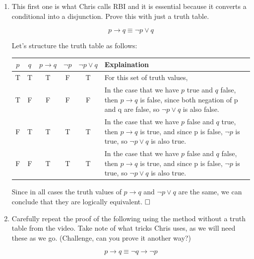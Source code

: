 \documentclass{article}
\newcommand{\sectionbreak}{\clearpage}
\begin{document}
\begin{enumerate}[label=(\alph*)]

    \item This first one is what Chris calls RBI and it is essential because it converts a conditional into a disjunction. Prove this with just a truth table.

    \[p \to q \equiv \neg p \lor q\]

    Let's structure the truth table as follows:
    \smallbreak
    \begin{tabular}{|c|c|c|c|c|p{11cm}|}
        \hline
        $p$ & $q$ & $p \to q$ & $\neg p$ & $\neg p \lor q$ & Explaination \\
        \hline
        T & T & T & F & T & For this set of truth values,  \\
        \hline
        T & F & F & F & F & In the case that we have $p$ true and $q$ false, then $p \to q$ is false, since both negation of p and q are false, so $\neg p \lor q$ is also false. \\
        \hline
        F & T & T & T & T & In the case that we have $p$ false and $q$ true, then $p \to q$ is true, and since p is false, $\neg p$ is true, so $\neg p \lor q$ is also true. \\
        \hline
        F & F & T & T & T & In the case that we have $p$ false and $q$ false, then $p \to q$ is true, and since p is false, $\neg p$ is true, so $\neg p \lor q$ is also true. \\
        \hline
    \end{tabular}
    \smallbreak
    Since in all cases the truth values of $p \to q$ and $\neg p \lor q$ are the same, we can conclude that they are logically equivalent.
    $\hfill \square$
    \sectionbreak
    \item Carefully repeat the proof of the following using the method without a truth table
    from the video. Take note of what tricks Chris uses, as we will need these as we
    go. (Challenge, can you prove it another way?)


    \[p \to q \equiv \neg q \to \neg p\]


\end{enumerate}
\end{document}
